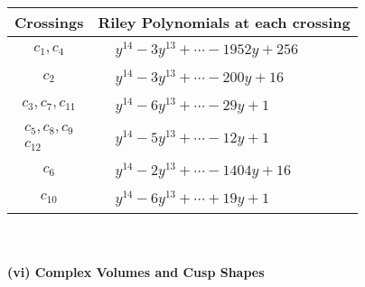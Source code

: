 \documentclass[1p]{elsarticle_modified}
\theoremstyle{definition}
\begin{document}
\begin{tabular}{m{50pt}|m{274pt}}
Crossings & \hspace{64pt}Riley Polynomials at each crossing \\
\hline $$\begin{aligned}c_{1},c_{4}\end{aligned}$$&$\begin{aligned}
&y^{14}-3 y^{13}+\cdots-1952 y+256
\end{aligned}$\\
\hline $$\begin{aligned}c_{2}\end{aligned}$$&$\begin{aligned}
&y^{14}-3 y^{13}+\cdots-200 y+16
\end{aligned}$\\
\hline $$\begin{aligned}c_{3},c_{7},c_{11}\end{aligned}$$&$\begin{aligned}
&y^{14}-6 y^{13}+\cdots-29 y+1
\end{aligned}$\\
\hline $$\begin{aligned}c_{5},c_{8},c_{9}\\c_{12}\end{aligned}$$&$\begin{aligned}
&y^{14}-5 y^{13}+\cdots-12 y+1
\end{aligned}$\\
\hline $$\begin{aligned}c_{6}\end{aligned}$$&$\begin{aligned}
&y^{14}-2 y^{13}+\cdots-1404 y+16
\end{aligned}$\\
\hline $$\begin{aligned}c_{10}\end{aligned}$$&$\begin{aligned}
&y^{14}-6 y^{13}+\cdots+19 y+1
\end{aligned}$\\
\hline
\end{tabular}\\~\\
\newpage\flushleft \textbf{(vi) Complex Volumes and Cusp Shapes}
\end{document}
